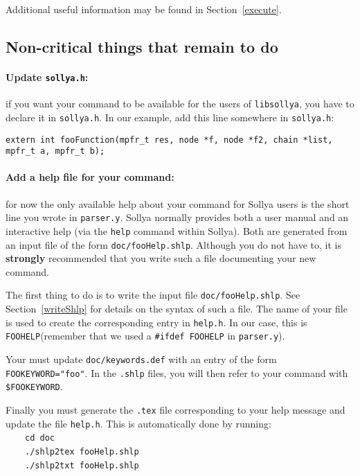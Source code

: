 \documentclass{article}
\newcommand{\commandName}{\texttt{foo}\xspace}
\newcommand{\commandFunction}{\texttt{fooFunction}\xspace}
\newcommand{\commandShlp}{\texttt{doc/fooHelp.shlp}\xspace}
\newcommand{\commandShlpWithoutDoc}{\texttt{fooHelp.shlp}\xspace} %
\newcommand{\commandHELP}{\texttt{FOOHELP}\xspace} %
\newcommand{\commandKeyword}{\texttt{FOOKEYWORD}}
\begin{document}
Additional useful information may be found in Section~\ref{execute}.

\subsection{Non-critical things that remain to do}

\paragraph{Update \texttt{sollya.h}: } if you want your command to be available for the users of \texttt{libsollya}, you have to declare it in \texttt{sollya.h}. In our example, add this line somewhere in \texttt{sollya.h}:\\
\begin{center}
  \texttt{extern int }\commandFunction\texttt{(mpfr\_t res, node *f, node *f2, chain *list, mpfr\_t a, mpfr\_t b);}
\end{center}

\paragraph{Add a help file for your command: } for now the only available help about your command for Sollya users is the short line you wrote in \texttt{parser.y}. Sollya normally provides both a user manual and an interactive help (via the \texttt{help} command within Sollya). Both are generated from an input file of the form \commandShlp. Although you do not have to, it is \textbf{strongly} recommended that you write such a file documenting your new command.

The first thing to do is to write the input file \commandShlp. See Section~\ref{writeShlp} for details on the syntax of such a file. The name of your file is used to create the corresponding entry in \texttt{help.h}. In our case, this is \commandHELP (remember that we used a \texttt{\#ifdef }\commandHELP in \texttt{parser.y}).

Your must update \texttt{doc/keywords.def} with an entry of the form \commandKeyword\texttt{="}\commandName\texttt{"}. In the \texttt{.shlp} files, you will then refer to your command with \texttt{\$}\commandKeyword.

Finally you must generate the \texttt{.tex} file corresponding to your help message and update the file \texttt{help.h}. This is automatically done by running:\\
\phantom{1}~~~~\texttt{cd doc}\\
\phantom{1}~~~~\texttt{./shlp2tex }\commandShlpWithoutDoc\\
\phantom{1}~~~~\texttt{./shlp2txt }\commandShlpWithoutDoc
\end{document}
